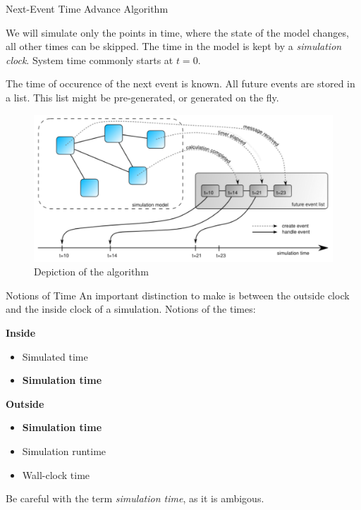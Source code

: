\documentclass[english]{panikzettel}
\newcommand{\alert}[1]{\textbf{\textcolor{red!75!black}{#1}}}
\begin{document}
	\begin{defi}{Next-Event Time Advance Algorithm}
		\begin{halfboxl}
			We will simulate only the points in time, where the state of the model changes, all other times can be skipped.
			The time in the model is kept by a \textit{simulation clock}.
			System time commonly starts at \( t = 0 \).
			
			The time of occurence of the next event is known. 
			All future events are stored in a list. 
			This list might be pre-generated, or generated on the fly.
		\end{halfboxl}%
		\begin{halfboxr}
			\vspace{-\baselineskip}
			\begin{figure}[H]
				\centering
				\includegraphics[width=\textwidth]{img/5-net-aa.png}
				\caption{Depiction of the algorithm}
				\label{img-5-net-aa}
			\end{figure}
		\end{halfboxr}
	\end{defi}

	\begin{defi}{Notions of Time}
		An important distinction to make is between the outside clock and the inside clock of a simulation. Notions of the times:

		\begin{halfboxl}
			\textbf{Inside}
			 \begin{itemize}
				\item Simulated time
				\item \alert{Simulation time} 
			\end{itemize}
		\end{halfboxl}%
		\begin{halfboxr}
			\vspace{-\baselineskip}
			\textbf{Outside} 
			\begin{itemize}
				\item \alert{Simulation time} 
				\item Simulation runtime
				\item Wall-clock time
			\end{itemize}
		\end{halfboxr}

		Be careful with the term \textit{simulation time}, as it is ambigous.
	\end{defi}
\end{document}
